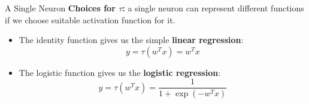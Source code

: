 \begin{vbframe}{A Single Neuron}
\textbf{Choices for $\tau$:} a single neuron can represent different functions if we choose suitable activation function for it.
\vspace{.5cm}
\begin{itemize}
\item The identity function gives us the simple \textbf{linear regression}:
$$y = \tau(w^Tx) = w^Tx$$
\vspace{.5cm}
\item The logistic function gives us the \textbf{logistic regression}:
$$y = \tau(w^Tx) = \frac{1}{1 + \exp(-w^Tx)}$$
\end{itemize}
\end{vbframe}

